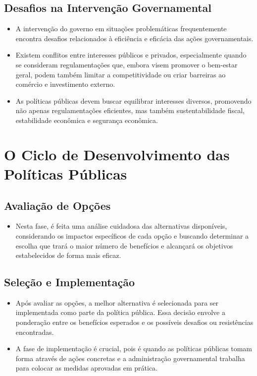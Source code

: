 \documentclass[
   article,       
   12pt,          
   oneside,       
   a4paper,       
   english,       
   brazil,        
   sumario=tradicional
   ]{abntex2}
\begin{document}
\subsection{Desafios na Intervenção Governamental}
\begin{itemize}
    \item A intervenção do governo em situações problemáticas frequentemente encontra desafios relacionados à eficiência e eficácia das ações governamentais.
    \item Existem conflitos entre interesses públicos e privados, especialmente quando se consideram regulamentações que, embora visem promover o bem-estar geral, podem também limitar a competitividade ou criar barreiras ao comércio e investimento externo.
    \item As políticas públicas devem buscar equilibrar interesses diversos, promovendo não apenas regulamentações eficientes, mas também sustentabilidade fiscal, estabilidade econômica e segurança econômica.
\end{itemize}

\section{O Ciclo de Desenvolvimento das Políticas Públicas}
\subsection{Avaliação de Opções}
\begin{itemize}
    \item Nesta fase, é feita uma análise cuidadosa das alternativas disponíveis, considerando os impactos específicos de cada opção e buscando determinar a escolha que trará o maior número de benefícios e alcançará os objetivos estabelecidos de forma mais eficaz.
\end{itemize}

\subsection{Seleção e Implementação}
\begin{itemize}
    \item Após avaliar as opções, a melhor alternativa é selecionada para ser implementada como parte da política pública. Essa decisão envolve a ponderação entre os benefícios esperados e os possíveis desafios ou resistências encontradas.
    \item A fase de implementação é crucial, pois é quando as políticas públicas tomam forma através de ações concretas e a administração governamental trabalha para colocar as medidas aprovadas em prática.
\end{itemize}
\end{document}
